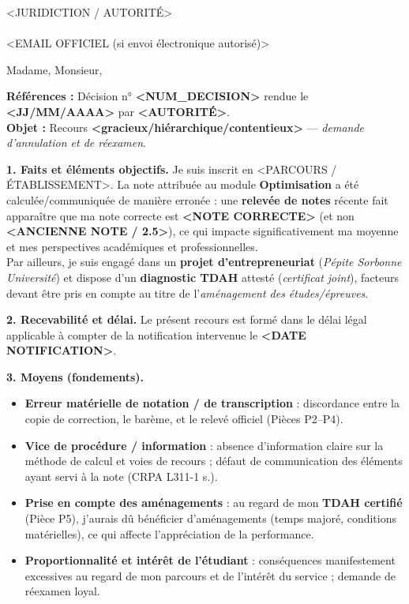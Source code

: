 \documentclass[11pt]{scrlttr2}
\begin{document}
\begin{letter}{<JURIDICTION / AUTORITÉ>\\<ADRESSE OFFICIELLE>\\<EMAIL OFFICIEL (si envoi électronique autorisé)>}
\opening{Madame, Monsieur,}

\textbf{Références :} Décision n° \textbf{<NUM_DECISION>} rendue le \textbf{<JJ/MM/AAAA>} par \textbf{<AUTORITÉ>}.\\
\textbf{Objet :} Recours \textbf{<gracieux/hiérarchique/contentieux>} — \textit{demande d'annulation et de réexamen}.

\vspace{0.6em}
\textbf{1. Faits et éléments objectifs.}
Je suis inscrit en <PARCOURS / ÉTABLISSEMENT>. La note attribuée au module \textbf{Optimisation} a été calculée/communiquée de manière erronée : une \textbf{relevée de notes} récente fait apparaître que ma note correcte est \textbf{<NOTE CORRECTE>} (et non \textbf{<ANCIENNE NOTE / 2.5>}), ce qui impacte significativement ma moyenne et mes perspectives académiques et professionnelles.\\
Par ailleurs, je suis engagé dans un \textbf{projet d'entrepreneuriat} (\textit{Pépite Sorbonne Université}) et dispose d'un \textbf{diagnostic TDAH} attesté (\textit{certificat joint}), facteurs devant être pris en compte au titre de l'\textit{aménagement des études/épreuves}.

\vspace{0.5em}
\textbf{2. Recevabilité et délai.}
Le présent recours est formé dans le délai légal applicable à compter de la notification intervenue le \textbf{<DATE NOTIFICATION>}.

\vspace{0.5em}
\textbf{3. Moyens (fondements).}
\begin{itemize}
  \item \textbf{Erreur matérielle de notation / de transcription} : discordance entre la copie de correction, le barème, et le relevé officiel (Pièces P2–P4).
  \item \textbf{Vice de procédure / information} : absence d'information claire sur la méthode de calcul et voies de recours ; défaut de communication des éléments ayant servi à la note (CRPA L311-1 s.).
  \item \textbf{Prise en compte des aménagements} : au regard de mon \textbf{TDAH certifié} (Pièce P5), j'aurais dû bénéficier d'aménagements (temps majoré, conditions matérielles), ce qui affecte l'appréciation de la performance.
  \item \textbf{Proportionnalité et intérêt de l'étudiant} : conséquences manifestement excessives au regard de mon parcours et de l'intérêt du service ; demande de réexamen loyal.
\end{itemize}


\end{letter}
\end{document}
